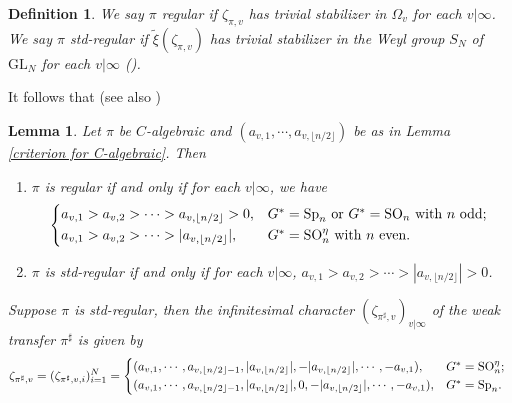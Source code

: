 \documentclass[12pt,oneside,reqno]{amsart}
\theoremstyle{plain}
\newtheorem{definition}[theorem]{Definition}
\newtheorem{lemma}[theorem]{Lemma}
\begin{document}
	
	\begin{definition}\label{regular and std-regular}
		We say $\pi$ \emph{regular} if $\zeta_{\pi,v}$ has trivial stabilizer in $\Omega_v$ for each $v|\infty$. We say $\pi$ \emph{std-regular} if $\widetilde{\xi}(\zeta_{\pi,v})$ has trivial stabilizer in the Weyl group $S_{N}$ of $\mathrm{GL}_N$ for each $v|\infty$ (\cite[Definition 3.2.1]{Shin2024}). 		
	\end{definition}
	It follows that (see also \cite[Lemma 3.2.2 and Example 3.2.3]{Shin2024})
	\begin{lemma}\label{regular and std-regular, characterisation}
		Let $\pi$ be $C$-algebraic and $(a_{v,1},\cdots,a_{v,\lfloor n/2\rfloor})$ be as in Lemma \ref{criterion for C-algebraic}. Then
		\begin{enumerate}
			\item 
			$\pi$ is regular if and only if for each $v|\infty$, we have
			\[
			\begin{cases*}
				a_{v,1}>a_{v,2}>\cdots>a_{v,\lfloor n/2\rfloor}>0,
				&
				$G^\ast=\mathrm{Sp}_n$ or $G^\ast=\mathrm{SO}_n$ with $n$ odd;
				\\
				a_{v,1}>a_{v,2}>\cdots>|a_{v,\lfloor n/2\rfloor}|,
				&
				$G^\ast=\mathrm{SO}_n^\eta$ with $n$ even.
			\end{cases*}
			\]
			
			
			
			\item 
			$\pi$ is std-regular if and only if for each $v|\infty$, $a_{v,1}>a_{v,2}>\cdots>|a_{v,\lfloor n/2\rfloor}|>0$.
		\end{enumerate}
		
		
		Suppose $\pi$ is std-regular, then the infinitesimal character $(\zeta_{\pi^\sharp,v})_{v|\infty}$ of the weak transfer $\pi^\sharp$ is given by
		\[
		\zeta_{\pi^\sharp,v}
		=
		(\zeta_{\pi^\sharp,v,i})_{i=1}^N
		=
		\begin{cases*}
			(a_{v,1},\cdots,a_{v,\lfloor n/2\rfloor-1},|a_{v,\lfloor n/2\rfloor}|,-|a_{v,\lfloor n/2\rfloor}|,\cdots,-a_{v,1}),
			&
			$G^\ast=\mathrm{SO}_n^\eta$;
			\\
			(a_{v,1},\cdots,a_{v,\lfloor n/2\rfloor-1},|a_{v,\lfloor n/2\rfloor}|,0,-|a_{v,\lfloor n/2\rfloor}|,\cdots,-a_{v,1}),
			&
			$G^\ast=\mathrm{Sp}_n$.
		\end{cases*}
		\]
	\end{lemma}
	
	
	
	
	
	
	
\end{document}
